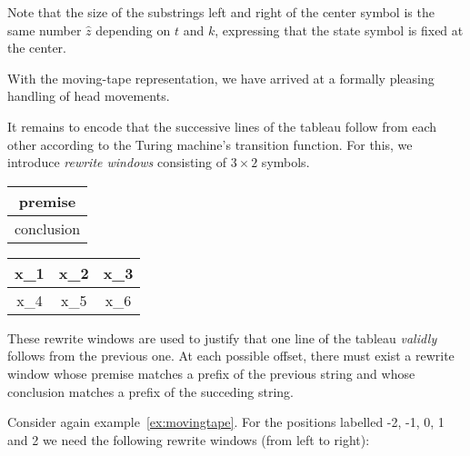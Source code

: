 \begin{example}
\begin{center}
  \end{center}
  Note that the size of the substrings left and right of the center symbol is the same number $\hat{z}$ depending on $t$ and $k$, expressing that the state symbol is fixed at the center.
\end{example}

With the moving-tape representation, we have arrived at a formally pleasing handling of head movements. 

It remains to encode that the successive lines of the tableau follow from each other according to the Turing machine's transition function.
For this, we introduce \emph{rewrite windows} consisting of $3 \times 2$ symbols. 
\begin{center}
  \begin{tabular}{C}
    premise\\
    \midrule
    \color{black}conclusion
  \end{tabular}
  \begin{tabular}{C|C|C}
    x_1 & x_2 & x_3 \\ 
    \midrule x_4 & x_5 & x_6
  \end{tabular}
\end{center}

These rewrite windows are used to justify that one line of the tableau \emph{validly} follows from the previous one. At each possible offset, there must exist a rewrite window whose premise matches a prefix of the previous string and whose conclusion matches a prefix of the succeding string.

\begin{example}\label{ex:rewwindows}
  Consider again example~\ref{ex:movingtape}. For the positions labelled -2, -1, 0, 1 and 2 we need the following rewrite windows (from left to right):
  \begin{center}
  \end{center}
\end{example}

